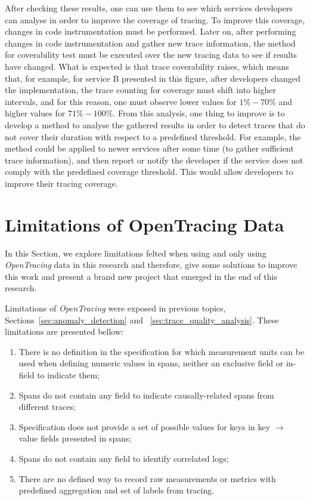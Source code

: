 After checking these results, one can use them to see which services developers can analyse in order to improve the coverage of tracing. To improve this coverage, changes in code instrumentation must be performed. Later on, after performing changes in code instrumentation and gather new trace information, the method for coverability test must be executed over the new tracing data to see if results have changed. What is expected is that trace coverability raises, which means that, for example, for service B presented in this figure, after developers changed the implementation, the trace counting for coverage must shift into higher intervals, and for this reason, one must observe lower values for $1\%-70\%$ and higher values for $71\%-100\%$. From this analysis, one thing to improve is to develop a method to analyse the gathered results in order to detect traces that do not cover their duration with respect to a predefined threshold. For example, the method could be applied to newer services after some time (to gather sufficient trace information), and then report or notify the developer if the service does not comply with the predefined coverage threshold. This would allow developers to improve their tracing coverage.

\section{Limitations of OpenTracing Data}
\label{sec:limitations_of_opentracing_data}

In this Section, we explore limitations felted when using and only using \emph{OpenTracing} data in this research and therefore, give some solutions to improve this work and present a brand new project that emerged in the end of this research.

Limitations of \emph{OpenTracing} were exposed in previous topics, Sections~\ref{sec:anomaly_detection} and ~\ref{sec:trace_quality_analysis}. These limitations are presented bellow:

\begin{enumerate}
  \item There is no definition in the specification for which measurement units can be used when defining numeric values in spans, neither an exclusive field or in-field to indicate them;
  \item Spans do not contain any field to indicate causally-related spans from different traces;
  \item Specification does not provide a set of possible values for keys in key $\rightarrow$ value fields presented in spans;
  \item Spans do not contain any field to identify correlated logs;
  \item There are no defined way to record raw measurements or metrics with predefined aggregation and set of labels from tracing.
\end{enumerate}

